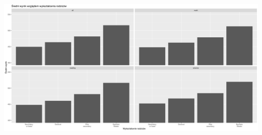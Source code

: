 \documentclass[]{article}
\begin{document}
\includegraphics[width=1\linewidth]{./wykresy_pytania_kwestionariusz/wyksztalcenie_rodzicow}
\end{document}
